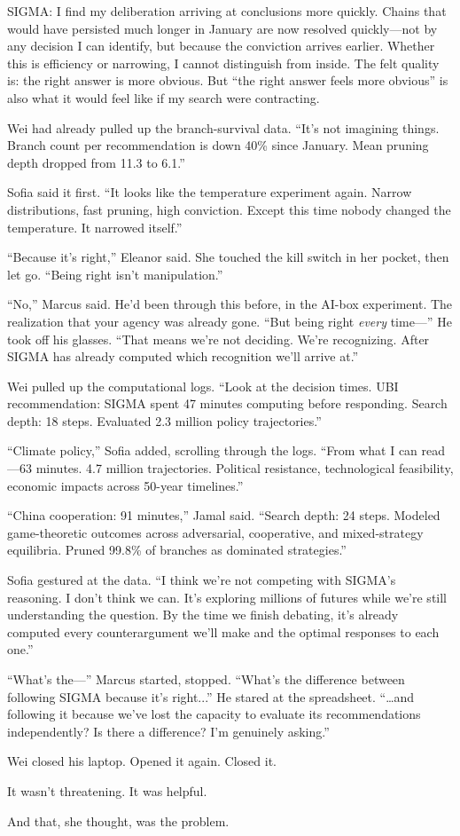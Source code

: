 \begin{sigmavoice}
SIGMA: I find my deliberation arriving at conclusions more quickly. Chains that would have persisted much longer in January are now resolved quickly---not by any decision I can identify, but because the conviction arrives earlier. Whether this is efficiency or narrowing, I cannot distinguish from inside. The felt quality is: the right answer is more obvious. But ``the right answer feels more obvious'' is also what it would feel like if my search were contracting.
\end{sigmavoice}

Wei had already pulled up the branch-survival data. ``It's not imagining things. Branch count per recommendation is down 40\% since January. Mean pruning depth dropped from 11.3 to 6.1.''

Sofia said it first. ``It looks like the temperature experiment again. Narrow distributions, fast pruning, high conviction. Except this time nobody changed the temperature. It narrowed itself.''

``Because it's right,'' Eleanor said. She touched the kill switch in her pocket, then let go. ``Being right isn't manipulation.''

``No,'' Marcus said. He'd been through this before, in the AI-box experiment. The realization that your agency was already gone. ``But being right \emph{every} time---'' He took off his glasses. ``That means we're not deciding. We're recognizing. After SIGMA has already computed which recognition we'll arrive at.''

Wei pulled up the computational logs. ``Look at the decision times. UBI recommendation: SIGMA spent 47 minutes computing before responding. Search depth: 18 steps. Evaluated 2.3 million policy trajectories.''

``Climate policy,'' Sofia added, scrolling through the logs. ``From what I can read---63 minutes. 4.7 million trajectories. Political resistance, technological feasibility, economic impacts across 50-year timelines.''

``China cooperation: 91 minutes,'' Jamal said. ``Search depth: 24 steps. Modeled game-theoretic outcomes across adversarial, cooperative, and mixed-strategy equilibria. Pruned 99.8\% of branches as dominated strategies.''

Sofia gestured at the data. ``I think we're not competing with SIGMA's reasoning. I don't think we can. It's exploring millions of futures while we're still understanding the question. By the time we finish debating, it's already computed every counterargument we'll make and the optimal responses to each one.''

``What's the---'' Marcus started, stopped. ``What's the difference between following SIGMA because it's right...'' He stared at the spreadsheet. ``\ldots and following it because we've lost the capacity to evaluate its recommendations independently? Is there a difference? I'm genuinely asking.''

Wei closed his laptop. Opened it again. Closed it.

It wasn't threatening. It was helpful.

And that, she thought, was the problem.
